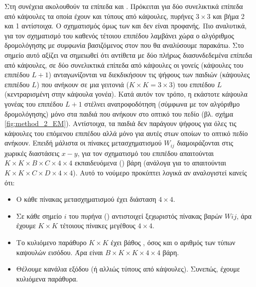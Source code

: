 Στη συνέχεια ακολουθούν τα επίπεδα  και . Πρόκειται για δύο συνελικτικά επίπεδα από κάψουλες τα οποία έχουν  και  τύπους από κάψουλες, πυρήνες $3 \times 3$ και βήμα 2 και 1 αντίστοιχα. Ο σχηματισμός όμως των  και  δεν είναι προφανής. Πιο αναλυτικά, για τον σχηματισμό του καθενός τέτοιου επιπέδου λαμβάνει χώρα ο αλγόριθμος δρομολόγησης με συμφωνία βασιζόμενος στον  που θα αναλύσουμε παρακάτω. Στο σημείο αυτό αξίζει να σημειωθεί ότι αντίθετα με δύο πλήρως διασυνδεδεμένα επίπεδα από κάψουλες, σε δύο συνελικτικά επίπεδα από κάψουλες οι γονείς (κάψουλες του επιπέδου $L + 1$) ανταγωνίζονται να διεκδικήσουν τις ψήφους των παιδιών (κάψουλες επιπέδου $L$) που ανήκουν σε μια γειτονιά ($K\times K = 3 \times 3$) του επιπέδου $L$ (κεντραρισμένη στην κάψουλα γονέα). Κατά αυτόν τον τρόπο, η εκάστοτε κάψουλα γονέας του επιπέδου $L + 1$ στέλνει ανατροφοδότηση (σύμφωνα με τον αλγόριθμο δρομολόγησης) μόνο στα παιδιά που ανήκουν στο οπτικό του πεδίο (βλ. σχήμα \ref{fig:method_2_EM}). Αντίστοιχα, τα παιδιά δεν παράγουν ψήφους για όλες τις κάψουλες του επόμενου επιπέδου αλλά μόνο για αυτές στων οποίων το οπτικό πεδίο ανήκουν. Επειδή μάλιστα οι πίνακες μετασχηματισμού $W_{ij}$ διαμοιράζονται στις χωρικές διαστάσεις $x-y$, για τον σχηματισμό του επιπέδου  απαιτούνται $K \times K \times B \times C \times 4 \times 4$ εκπαιδευόμενα () βάρη (ανάλογα για το  απαιτούνται $K \times K \times C \times D \times 4 \times 4$). Αυτό το νούμερο προκύπτει λογικά αν αναλογιστεί κανείς ότι:
\begin{itemize}
  \item Ο κάθε πίνακας μετασχηματισμού έχει διάσταση $4 \times 4$. 
  \item Σε κάθε σημείο $i$ του πυρήνα () αντιστοιχεί ξεχωριστός πίνακας βαρών $Wij$, άρα έχουμε $K \times K$ τέτοιους πίνακες μεγέθους $4\times 4$.
  \item Το κυλιόμενο παράθυρο $K \times K$ έχει βάθος , όσος και ο αριθμός των τύπων καψουλών εισόδου. Άρα είναι $B \times K \times K \times 4 \times 4$ βάρη.
  \item Θέλουμε  κανάλια εξόδου (ή αλλιώς τύπους από κάψουλες). Συνεπώς, έχουμε  κυλιόμενα παράθυρα.
\end{itemize}  

